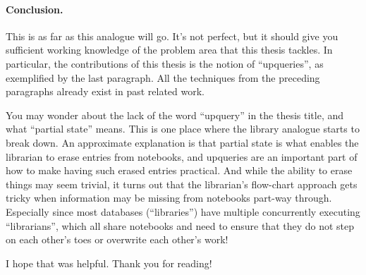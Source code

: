 \paragraph{Conclusion.}
%
This is as far as this analogue will go. It's not perfect, but it should give
you sufficient working knowledge of the problem area that this thesis tackles.
In particular, the contributions of this thesis is the notion of ``upqueries'',
as exemplified by the last paragraph. All the techniques from the preceding
paragraphs already exist in past related work.

You may wonder about the lack of the word ``upquery'' in the thesis title, and
what ``partial state'' means. This is one place where the library analogue
starts to break down. An approximate explanation is that partial state is what
enables the librarian to erase entries from notebooks, and upqueries are an
important part of how to make having such erased entries practical. And while
the ability to erase things may seem trivial, it turns out that the librarian's
flow-chart approach gets tricky when information may be missing from notebooks
part-way through. Especially since most databases (``libraries'') have multiple
concurrently executing ``librarians'', which all share notebooks and need to
ensure that they do not step on each other's toes or overwrite each other's
work!

I hope that was helpful. Thank you for reading!
